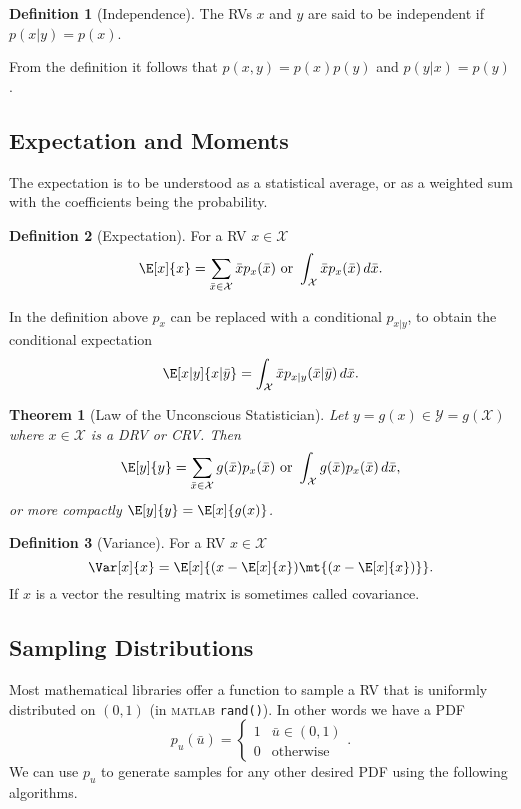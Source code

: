 \documentclass[]{hsrzf}
\theoremstyle{plain}
\newtheorem{thm}{Theorem}[section]
\theoremstyle{definition}
\newtheorem{defn}{Definition}[section]
\theoremstyle{remark}
\begin{document}

\begin{defn}[Independence]
  The RVs $x$ and $y$ are said to be independent if $p(x|y) = p(x)$.
\end{defn}

From the definition it follows that $p(x,y) = p(x)p(y)$ and $p(y|x) = p(y)$.

\subsection{Expectation and Moments}

The expectation is to be understood as a statistical average, or as a weighted
sum with the coefficients being the probability.

\begin{defn}[Expectation]
  For a RV $x \in \mathcal{X}$
  \[
    \E[x]{x}
       = \sum_{\bar{x} \in \mathcal{X}} \bar{x} p_x(\bar{x})
       \text{ or }
       \int_\mathcal{X} \bar{x} p_x(\bar{x}) \, d\bar{x}.
  \]
\end{defn}

In the definition above $p_x$ can be replaced with a conditional $p_{x|y}$, to
obtain the conditional expectation
\[
  \E[x|y]{x | \bar{y}} 
    = \int_\mathcal{X} \bar{x} p_{x|y}(\bar{x} | \bar{y}) \, d\bar{x}.
\]

\begin{thm}[Law of the Unconscious Statistician]
  Let $y = g(x) \in \mathcal{Y} = g(\mathcal{X})$ where $x \in \mathcal{X}$ is
  a DRV or CRV. Then
  \[
    \E[y]{y} = \sum_{\bar{x} \in \mathcal{X}} g(\bar{x}) p_x(\bar{x})
      \text{ or }
      \int_\mathcal{X} g(\bar{x}) p_x(\bar{x}) \, d\bar{x},
  \]
  or more compactly $\E[y]{y} = \E[x]{g(x)}$.
\end{thm}

\begin{defn}[Variance]
  For a RV $x \in \mathcal{X}$
  \[
    \Var[x]{x} = \E[x]{(x - \E[x]{x})\mt{(x - \E[x]{x})}}.
  \]
  If $x$ is a vector the resulting matrix is sometimes called covariance.
\end{defn}

\subsection{Sampling Distributions} 
\label{sec:probability-review:sampling-distributions}

Most mathematical libraries offer a function to sample a RV that is uniformly
distributed on $(0,1)$ (in \textsc{matlab} \texttt{rand()}). In other words we
have a PDF
\[
  p_u(\bar{u}) = \begin{cases}
    1 & \bar{u} \in (0,1) \\
    0 & \text{otherwise}
  \end{cases}.
\]
We can use $p_u$ to generate samples for any other desired PDF using the
following algorithms.
\end{document}
